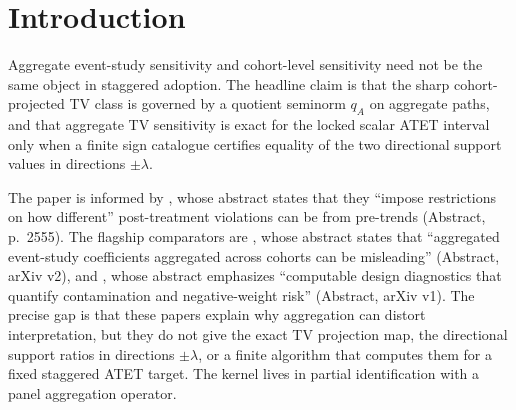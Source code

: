 \documentclass[11pt]{article}
\theoremstyle{definition}
\theoremstyle{plain}
\theoremstyle{remark}
\begin{document}
\begin{abstract}
Staggered-adoption sensitivity analyses are often imposed after event-time aggregation, even though the untreated-trend deviations live on cohort-event cells before aggregation. This proposal asks when a total-variation restriction written on the aggregate event-study path is the exact projection of the cohort-level TV class for a scalar ATET target. The routine result is a sharp partial-identification theorem: the projected cohort class is summarized by a new quotient seminorm \(q_A\) on aggregate paths, and the sharp ATET interval is the support interval generated by \(q_A\), not by the naive aggregate TV seminorm \(q_{\mathrm{agg}}\). The flagship conjecture is an explicit finite sign-catalogue algorithm for the two directional support ratios \(R_+(\lambda)\) and \(R_-(\lambda)\), which certify whether aggregate TV sensitivity is exact, conservative, or anti-conservative for the locked scalar ATET interval. If resolved, the result would tell applied staggered-DiD users when an aggregate TV robustness plot is already sharp and when it must be lifted back to cohort-event geometry before interpretation.
\end{abstract}

\section{Introduction}
Aggregate event-study sensitivity and cohort-level sensitivity need not be the same object in staggered adoption. The headline claim is that the sharp cohort-projected TV class is governed by a quotient seminorm \(q_A\) on aggregate paths, and that aggregate TV sensitivity is exact for the locked scalar ATET interval only when a finite sign catalogue certifies equality of the two directional support values in directions \(\pm\lambda\).

The paper is informed by \citet{RambachanRoth2023CrediblePT}, whose abstract states that they ``impose restrictions on how different'' post-treatment violations can be from pre-trends (Abstract, p.~2555). The flagship comparators are \citet{Liu2025CohortAnchored}, whose abstract states that ``aggregated event-study coefficients aggregated across cohorts can be misleading'' (Abstract, arXiv v2), and \citet{Wright2026DesignRobust}, whose abstract emphasizes ``computable design diagnostics that quantify contamination and negative-weight risk'' (Abstract, arXiv v1). The precise gap is that these papers explain why aggregation can distort interpretation, but they do not give the exact TV projection map, the directional support ratios in directions \(\pm\lambda\), or a finite algorithm that computes them for a fixed staggered ATET target. The kernel lives in partial identification with a panel aggregation operator.
\end{document}
